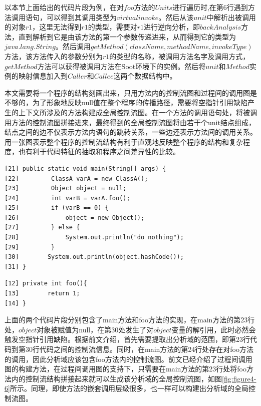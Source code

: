 以本节上面给出的代码片段为例，在对$foo$方法的$Units$进行遍历时,在第6行遇到方法调用语句，可以得到其调用类型为$virtualinvoke$。然后从该$unit$中解析出被调用的对象$r1$，这里无法得到$r1$的类型，需要对$r1$进行逆向分析，即$backAnalysis$方法，直到解析到它是由该方法的第一个参数传递进来，从而得到它的类型为$java.lang.String$。然后调用$getMethod(className,methodName,invokeType)$方法，该方法传入的参数分别为$r1$的类型的名称，被调用方法名字及调用方式，$getMethod$方法可以获得被调用方法在Soot环境下的实例。然后将$unit$和$Method$实例的映射信息加入到$Caller$和$Callee$这两个数据结构中。

本文需要将一个程序的结构刻画出来，只用方法内的控制流图和过程间的调用图是不够的，为了形象地反映null值在整个程序的传播路径，需要将空指针引用缺陷产生的上下文所涉及的方法构建成全局控制流图。在一个方法的调用语句处，将被调用方法的控制流图拼接进来，最终得到的全局控制流图将由若干个unit结点组成，结点之间的边不仅表示方法内语句的跳转关系，一些边还表示方法间的调用关系。用一张图表示整个程序的控制流结构有利于直观地反映整个程序的结构和复杂程度，也有利于代码特征的抽取和程序之间差异性的比较。

\begin{lstlisting}[language={[AspectJ]Java},keywordstyle=\color{blue!70},commentstyle=\color{red!50!green!50!blue!50},frame=shadowbox, rulesepcolor=\color{red!20!green!20!blue!20}] 
[21] public static void main(String[] args) {
[22]         ClassA varA = new ClassA();
[23]         Object object = null;
[24]         int varB = varA.foo();
[25]         if (varB == 0) {
[26]             object = new Object();
[27]         } else {
[28]             System.out.println("do nothing");
[29]         }
[30]        System.out.println(object.hashCode());
[31] }
\end{lstlisting}

\begin{lstlisting}[language={[AspectJ]Java},keywordstyle=\color{blue!70},commentstyle=\color{red!50!green!50!blue!50},frame=shadowbox, rulesepcolor=\color{red!20!green!20!blue!20}] 
[12] private int foo(){
[13]        return 1;
[14] }
\end{lstlisting}

上面的两个代码片段分别包含了main方法和foo方法的实现，在main方法的第23行处，$object$对象被赋值为null，在第30处发生了对$object$变量的解引用，此时必然会触发空指针引用缺陷。根据前文介绍，首先需要提取出分析域的范围，即第23行代码到第30行代码之间的控制流信息。同时，在main方法的第24行处存在对foo方法的调用，因此分析域应该包含foo方法内的控制流图。前文已经介绍了过程间调用图的构建方法，在过程间调用图的支持下，只需要在main方法的第23行处将foo方法内的控制流结构拼接起来就可以生成该分析域的全局控制流图，如图\ref{fig:figure4-6}所示。同理，即使方法的嵌套调用层级很多，也一样可以构建出分析域的全局控制流图。


